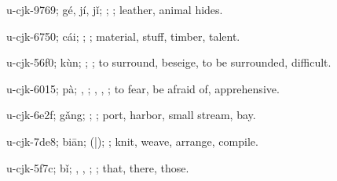\begin{multicols}{2}
{\cjkgGlue{}u-cjk-9769; gé, jí, jǐ; \cjkgGlue{}; \cjkgGlue{}; leather, animal hides.

\cjkgGlue{}u-cjk-6750; cái; \cjkgGlue{}; \cjkgGlue{}; material, stuff, timber, talent.

\cjkgGlue{}u-cjk-56f0; kùn; \cjkgGlue{}\cjkgGlue{}\cjkgGlue{}; \cjkgGlue{}; to surround, beseige, to be surrounded, difficult.

\cjkgGlue{}u-cjk-6015; pà; \cjkgGlue{}, \cjkgGlue{}\cjkgGlue{}\cjkgGlue{}; \cjkgGlue{}, \cjkgGlue{}, \cjkgGlue{}; to fear, be afraid of, apprehensive.

\cjkgGlue{}u-cjk-6e2f; gǎng; \cjkgGlue{}; \cjkgGlue{}; port, harbor, small stream, bay.

\cjkgGlue{}u-cjk-7de8; biān; \cjkgGlue{}\cjkgGlue{}(\cjkgGlue{}|\cjkgGlue{}); \cjkgGlue{}; knit, weave, arrange, compile.

\cjkgGlue{}u-cjk-5f7c; bǐ; \cjkgGlue{}, \cjkgGlue{}, \cjkgGlue{}\cjkgGlue{}\cjkgGlue{}; \cjkgGlue{}; that, there, those.

}
\end{multicols}
